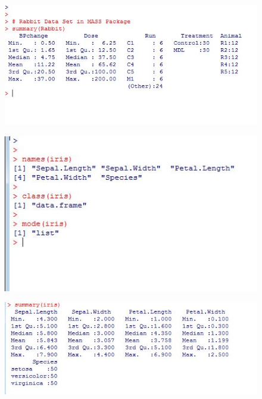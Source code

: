 \documentclass{beamer}
\begin{document}
 	\begin{frame}
 		\begin{figure}
 			\centering
 			\includegraphics[width=1.2\linewidth]{images/rabbitsummary}   
 		\end{figure}
 	\end{frame} 
 	
 	\begin{frame}
 		\begin{figure}  
 			\includegraphics[width=1.2\linewidth]{images/irisinspect}     
 		\end{figure}
 	\end{frame}   
 	\begin{frame}
 		\begin{figure}
 			\centering
 			\includegraphics[width=1.2\linewidth]{images/irissummary}
 		\end{figure}
 	\end{frame}   
 	
\end{document}
